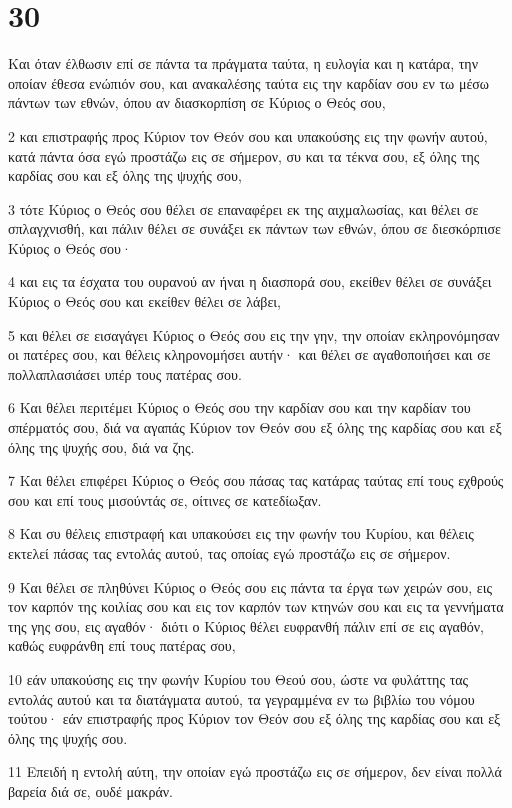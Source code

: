 \chapter{30}

\par Και όταν έλθωσιν επί σε πάντα τα πράγματα ταύτα, η ευλογία και η κατάρα, την οποίαν έθεσα ενώπιόν σου, και ανακαλέσης ταύτα εις την καρδίαν σου εν τω μέσω πάντων των εθνών, όπου αν διασκορπίση σε Κύριος ο Θεός σου,
\par 2 και επιστραφής προς Κύριον τον Θεόν σου και υπακούσης εις την φωνήν αυτού, κατά πάντα όσα εγώ προστάζω εις σε σήμερον, συ και τα τέκνα σου, εξ όλης της καρδίας σου και εξ όλης της ψυχής σου,
\par 3 τότε Κύριος ο Θεός σου θέλει σε επαναφέρει εκ της αιχμαλωσίας, και θέλει σε σπλαγχνισθή, και πάλιν θέλει σε συνάξει εκ πάντων των εθνών, όπου σε διεσκόρπισε Κύριος ο Θεός σου·
\par 4 και εις τα έσχατα του ουρανού αν ήναι η διασπορά σου, εκείθεν θέλει σε συνάξει Κύριος ο Θεός σου και εκείθεν θέλει σε λάβει,
\par 5 και θέλει σε εισαγάγει Κύριος ο Θεός σου εις την γην, την οποίαν εκληρονόμησαν οι πατέρες σου, και θέλεις κληρονομήσει αυτήν· και θέλει σε αγαθοποιήσει και σε πολλαπλασιάσει υπέρ τους πατέρας σου.
\par 6 Και θέλει περιτέμει Κύριος ο Θεός σου την καρδίαν σου και την καρδίαν του σπέρματός σου, διά να αγαπάς Κύριον τον Θεόν σου εξ όλης της καρδίας σου και εξ όλης της ψυχής σου, διά να ζης.
\par 7 Και θέλει επιφέρει Κύριος ο Θεός σου πάσας τας κατάρας ταύτας επί τους εχθρούς σου και επί τους μισούντάς σε, οίτινες σε κατεδίωξαν.
\par 8 Και συ θέλεις επιστραφή και υπακούσει εις την φωνήν του Κυρίου, και θέλεις εκτελεί πάσας τας εντολάς αυτού, τας οποίας εγώ προστάζω εις σε σήμερον.
\par 9 Και θέλει σε πληθύνει Κύριος ο Θεός σου εις πάντα τα έργα των χειρών σου, εις τον καρπόν της κοιλίας σου και εις τον καρπόν των κτηνών σου και εις τα γεννήματα της γης σου, εις αγαθόν· διότι ο Κύριος θέλει ευφρανθή πάλιν επί σε εις αγαθόν, καθώς ευφράνθη επί τους πατέρας σου,
\par 10 εάν υπακούσης εις την φωνήν Κυρίου του Θεού σου, ώστε να φυλάττης τας εντολάς αυτού και τα διατάγματα αυτού, τα γεγραμμένα εν τω βιβλίω του νόμου τούτου· εάν επιστραφής προς Κύριον τον Θεόν σου εξ όλης της καρδίας σου και εξ όλης της ψυχής σου.
\par 11 Επειδή η εντολή αύτη, την οποίαν εγώ προστάζω εις σε σήμερον, δεν είναι πολλά βαρεία διά σε, ουδέ μακράν.
